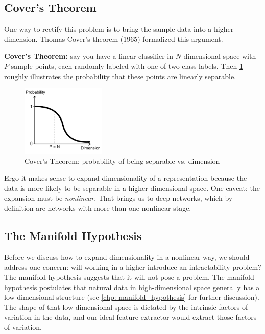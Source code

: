 \subsection{Cover's Theorem}

One way to rectify this problem is to bring the sample data into a higher dimension.
Thomas Cover's theorem (1965) formalized this argument.

\textbf{Cover's Theorem:} say you have a linear classifier in $N$ dimensional space with $P$ sample points, each randomly labeled with one of two class labels.
Then \cref{fig:covers_theorem} roughly illustrates the probability that these points are linearly separable.

\begin{figure}[ht]
\centering
\includegraphics[width=40mm]{lectures/01-b/covers_theorem.png}
\caption{Cover's Theorem: probability of being separable vs. dimension}
\label{fig:covers_theorem}
\end{figure}

Ergo it makes sense to expand dimensionality of a representation because the data is more likely to be separable in a higher dimensional space.
One caveat: the expansion must be \emph{nonlinear}.
That brings us to deep networks, which by definition are networks with more than one nonlinear stage.

\subsection{The Manifold Hypothesis}

Before we discuss how to expand dimensionality in a nonlinear way, we should address one concern: will working in a higher introduce an intractability problem?
The manifold hypothesis suggests that it will not pose a problem.
The manifold hypothesis postulates that natural data in high-dimensional space generally has a low-dimensional structure (see \cref{chp: manifold_hypothesis} for further discussion).
The shape of that low-dimensional space is dictated by the intrinsic factors of variation in the data, and our ideal feature extractor would extract those factors of variation.

